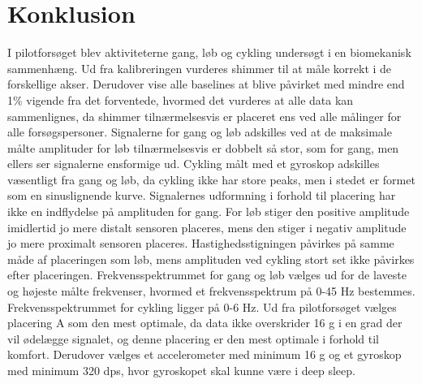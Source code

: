 \section{Konklusion}
I pilotforsøget blev aktiviteterne gang, løb og cykling undersøgt i en biomekanisk sammenhæng. Ud fra kalibreringen vurderes shimmer til at måle korrekt i de forskellige akser. Derudover vise alle baselines at blive påvirket med mindre end 1\% vigende fra det forventede, hvormed det vurderes at alle data kan sammenlignes, da shimmer tilnærmelsesvis er placeret ens ved alle målinger for alle forsøgspersoner. \newline
Signalerne for gang og løb adskilles ved at de maksimale målte amplituder for løb tilnærmelsesvis er dobbelt så stor, som for gang, men ellers ser signalerne ensformige ud. Cykling målt med et gyroskop adskilles væsentligt fra gang og løb, da cykling ikke har store peaks, men i stedet er formet som en sinuslignende kurve. \newline
Signalernes udformning i forhold til placering har ikke en indflydelse på amplituden for gang. For løb stiger den positive amplitude imidlertid jo mere distalt sensoren placeres, mens den stiger i negativ amplitude jo mere proximalt sensoren placeres. Hastighedsstigningen påvirkes på samme måde af placeringen som løb, mens amplituden ved cykling stort set ikke påvirkes efter placeringen. \newline
Frekvensspektrummet for gang og løb vælges ud for de laveste og højeste målte frekvenser, hvormed et frekvensspektrum på 0-45 Hz bestemmes. Frekvensspektrummet for cykling ligger på 0-6 Hz.\newline
Ud fra pilotforsøget vælges placering A som den mest optimale, da data ikke overskrider 16 g i en grad der vil ødelægge signalet, og denne placering er den mest optimale i forhold til komfort. Derudover vælges et accelerometer med minimum 16 g og et gyroskop med minimum 320 dps, hvor gyroskopet skal kunne være i deep sleep. 



